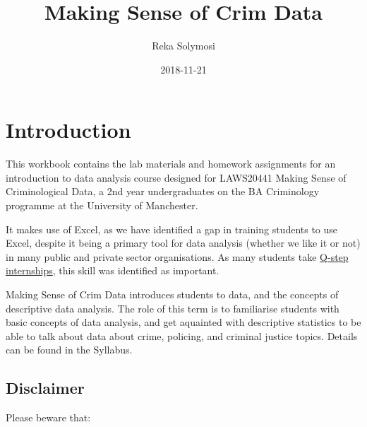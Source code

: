 \documentclass[]{book}
\title{Making Sense of Crim Data}
\author{Reka Solymosi}
\date{2018-11-21}
\theoremstyle{definition}
\theoremstyle{definition}
\theoremstyle{definition}
\theoremstyle{remark}
\begin{document}
\maketitle

{
\setcounter{tocdepth}{1}
\tableofcontents
}
\hypertarget{introduction}{%
\chapter*{Introduction}\label{introduction}}

This workbook contains the lab materials and homework assignments for an
introduction to data analysis course designed for LAWS20441 Making Sense
of Criminological Data, a 2nd year undergraduates on the BA Criminology
programme at the University of Manchester.

It makes use of Excel, as we have identified a gap in training students
to use Excel, despite it being a primary tool for data analysis (whether
we like it or not) in many public and private sector organisations. As
many students take
\href{https://www.humanities.manchester.ac.uk/q-step/}{Q-step
internships}, this skill was identified as important.

Making Sense of Crim Data introduces students to data, and the concepts
of descriptive data analysis. The role of this term is to familiarise
students with basic concepts of data analysis, and get aquainted with
descriptive statistics to be able to talk about data about crime,
policing, and criminal justice topics. Details can be found in the
Syllabus.

\hypertarget{disclaimer}{%
\section{Disclaimer}\label{disclaimer}}

Please beware that:
\end{document}
